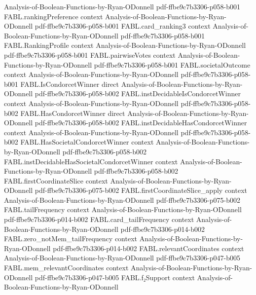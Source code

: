 \begin{theorem}
  {Analysis-of-Boolean-Functions-by-Ryan-ODonnell}
  {pdf-ffbe9c7b3306-p058-b001}
\proofstep
  {FABL.rankingPreference}
  {context}
  {Analysis-of-Boolean-Functions-by-Ryan-ODonnell}
  {pdf-ffbe9c7b3306-p058-b001}
\proofstep
  {FABL.card_ranking3}
  {context}
  {Analysis-of-Boolean-Functions-by-Ryan-ODonnell}
  {pdf-ffbe9c7b3306-p058-b001}
\proofstep
  {FABL.RankingProfile}
  {context}
  {Analysis-of-Boolean-Functions-by-Ryan-ODonnell}
  {pdf-ffbe9c7b3306-p058-b001}
\proofstep
  {FABL.pairwiseVotes}
  {context}
  {Analysis-of-Boolean-Functions-by-Ryan-ODonnell}
  {pdf-ffbe9c7b3306-p058-b001}
\proofstep
  {FABL.societalOutcome}
  {context}
  {Analysis-of-Boolean-Functions-by-Ryan-ODonnell}
  {pdf-ffbe9c7b3306-p058-b001}
\proofstep
  {FABL.IsCondorcetWinner}
  {direct}
  {Analysis-of-Boolean-Functions-by-Ryan-ODonnell}
  {pdf-ffbe9c7b3306-p058-b002}
\proofstep
  {FABL.instDecidableIsCondorcetWinner}
  {context}
  {Analysis-of-Boolean-Functions-by-Ryan-ODonnell}
  {pdf-ffbe9c7b3306-p058-b002}
\proofstep
  {FABL.HasCondorcetWinner}
  {direct}
  {Analysis-of-Boolean-Functions-by-Ryan-ODonnell}
  {pdf-ffbe9c7b3306-p058-b002}
\proofstep
  {FABL.instDecidableHasCondorcetWinner}
  {context}
  {Analysis-of-Boolean-Functions-by-Ryan-ODonnell}
  {pdf-ffbe9c7b3306-p058-b002}
\proofstep
  {FABL.HasSocietalCondorcetWinner}
  {context}
  {Analysis-of-Boolean-Functions-by-Ryan-ODonnell}
  {pdf-ffbe9c7b3306-p058-b002}
\proofstep
  {FABL.instDecidableHasSocietalCondorcetWinner}
  {context}
  {Analysis-of-Boolean-Functions-by-Ryan-ODonnell}
  {pdf-ffbe9c7b3306-p058-b002}
\proofstep
  {FABL.firstCoordinateSlice}
  {context}
  {Analysis-of-Boolean-Functions-by-Ryan-ODonnell}
  {pdf-ffbe9c7b3306-p075-b002}
\proofstep
  {FABL.firstCoordinateSlice_apply}
  {context}
  {Analysis-of-Boolean-Functions-by-Ryan-ODonnell}
  {pdf-ffbe9c7b3306-p075-b002}
\proofstep
  {FABL.tailFrequency}
  {context}
  {Analysis-of-Boolean-Functions-by-Ryan-ODonnell}
  {pdf-ffbe9c7b3306-p014-b002}
\proofstep
  {FABL.card_tailFrequency}
  {context}
  {Analysis-of-Boolean-Functions-by-Ryan-ODonnell}
  {pdf-ffbe9c7b3306-p014-b002}
\proofstep
  {FABL.zero_notMem_tailFrequency}
  {context}
  {Analysis-of-Boolean-Functions-by-Ryan-ODonnell}
  {pdf-ffbe9c7b3306-p014-b002}
\proofstep
  {FABL.relevantCoordinates}
  {context}
  {Analysis-of-Boolean-Functions-by-Ryan-ODonnell}
  {pdf-ffbe9c7b3306-p047-b005}
\proofstep
  {FABL.mem_relevantCoordinates}
  {context}
  {Analysis-of-Boolean-Functions-by-Ryan-ODonnell}
  {pdf-ffbe9c7b3306-p047-b005}
\proofstep
  {FABL.f₂Support}
  {context}
  {Analysis-of-Boolean-Functions-by-Ryan-ODonnell}

\end{theorem}
